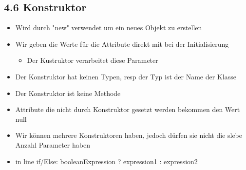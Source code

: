 \documentclass[11pt]{article}
\begin{document}
\subsection{4.6 Konstruktor}
\label{sec:orga586227}
\begin{itemize}
\item Wird durch "new" verwendet um ein neues Objekt zu erstellen\\
\item Wir geben die Werte für die Attribute direkt mit bei der Initialisierung\\
\begin{itemize}
\item Der Kustruktor verarbeitet diese Parameter\\
\end{itemize}
\item Der Konstruktor hat keinen Typen, resp der Typ ist der Name der Klasse\\
\item Der Konstruktor ist keine Methode\\
\item Attribute die nicht durch Konstruktor gesetzt werden bekommen den Wert null\\
\item Wir können mehrere Konstruktoren haben, jedoch dürfen sie nicht die slebe Anzahl Parameter haben\\

\item in line if/Else: booleanExpression ? expression1 : expression2\\
\end{itemize}
\end{document}
